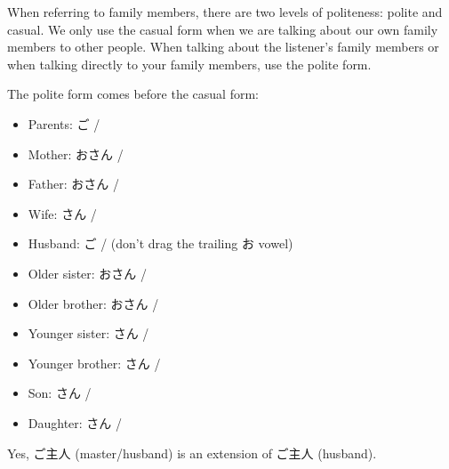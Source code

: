 \documentclass[../nihongo-gakushuu-kyouzai.tex]{subfiles}
\begin{document}
When referring to family members, there are two levels of politeness: polite and casual. We only use the casual form when we are talking about our own family members to other people. When talking about the listener's family members or when talking directly to your family members, use the polite form.

The polite form comes before the casual form:
\begin{itemize}
    \item Parents: ご / 
    \item Mother: おさん / 
    \item Father: おさん / 
    \item Wife: さん / 
    \item Husband: ご /  (don't drag the trailing お vowel)
    \item Older sister: おさん / 
    \item Older brother: おさん / 
    \item Younger sister: さん / 
    \item Younger brother: さん / 
    \item Son: さん / 
    \item Daughter: さん / 
\end{itemize}
Yes, ご主人 (master/husband) is an extension of ご主人 (husband).
\end{document}
